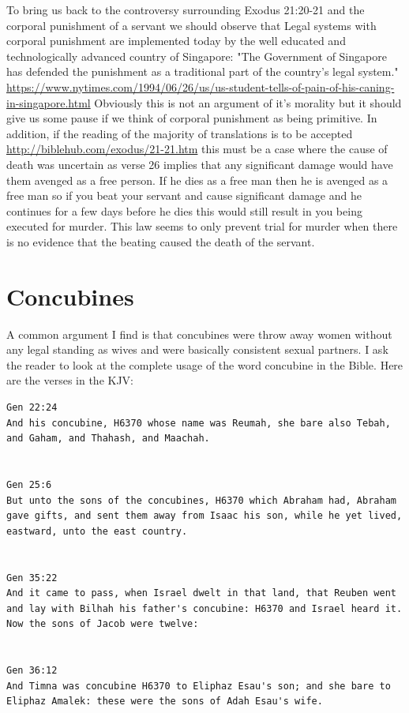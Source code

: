 \documentclass[11pt]{article}
\begin{document}
{To bring us back to the controversy surrounding Exodus 21:20-21 and the corporal punishment of a servant we should observe that Legal systems with corporal punishment are implemented today by the well educated and technologically advanced country of Singapore: "The Government of Singapore has defended the punishment as a traditional part of the country's legal system." \url{https://www.nytimes.com/1994/06/26/us/us-student-tells-of-pain-of-his-caning-in-singapore.html} Obviously this is not an argument of it's morality but it should give us some pause if we think of corporal punishment as being primitive. In addition, if the reading of the majority of translations is to be accepted \url{http://biblehub.com/exodus/21-21.htm} this must be a case where the cause of death was uncertain as verse 26 implies that any significant damage would have them avenged as a free person. If he dies as a free man then he is avenged as a free man so if you beat your servant and cause significant damage and he continues for a few days before he dies this would still result in you being executed for murder. This law seems to only prevent trial for murder when there is no evidence that the beating caused the death of the servant.


\section{Concubines}

A common argument I find is that concubines were throw away women without any legal standing as wives and were basically consistent sexual partners. I ask the reader to look at the complete usage of the word concubine in the Bible. Here are the verses in the KJV:

\begin{lstlisting}
Gen 22:24
And his concubine, H6370 whose name was Reumah, she bare also Tebah, and Gaham, and Thahash, and Maachah.


Gen 25:6
But unto the sons of the concubines, H6370 which Abraham had, Abraham gave gifts, and sent them away from Isaac his son, while he yet lived, eastward, unto the east country.


Gen 35:22
And it came to pass, when Israel dwelt in that land, that Reuben went and lay with Bilhah his father's concubine: H6370 and Israel heard it. Now the sons of Jacob were twelve:


Gen 36:12
And Timna was concubine H6370 to Eliphaz Esau's son; and she bare to Eliphaz Amalek: these were the sons of Adah Esau's wife.



\end{lstlisting}}
\end{document}
